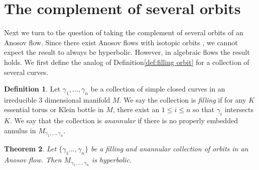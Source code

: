 \documentclass[12pt]{amsart}
\newtheorem{theorem}{Theorem}[section]
\theoremstyle{definition}
\newtheorem{definition}[theorem]{Definition}
\theoremstyle{remark}
\begin{document}
\section{The complement of several orbits}
\label{sec:several orbits}

Next we turn to the question of taking the complement of several orbits of an Anosov flow. Since there exist Anosov flows with isotopic orbits \cite{BarthelemeFenley2014KnotTheory}, we cannot expect the result to always be hyperbolic. However, in algebraic flows the result holds. We first define the analog of Definition\ref{def:filling orbit} for a collection of several curves.

\begin{definition}\label{def:filling several orbit}
    Let $\gamma_1,\dots,\gamma_n$ be a collection of simple closed curves in an irreducible 3 dimensional manifold $M$. We say the collection is \emph{filling} if for any $K$ essential torus or Klein bottle in $M$, there exist an $1\leq i\leq n$ so that $\gamma_i$ intersects $K$. We say that the collection is \emph{anannular} if there is no properly embedded annulus in $M_{\gamma_1,\dots,\gamma_n}$.
\end{definition}

\begin{theorem}\label{pro: filling anannular set is hyperbolic}
    Let $\{\gamma_1\dots,\gamma_n\}$ be a filling and anannular collection of orbits in an Anosov flow. Then $M_{\gamma_1,\dots,\gamma_n}$ is hyperbolic.
\end{theorem}
\end{document}
